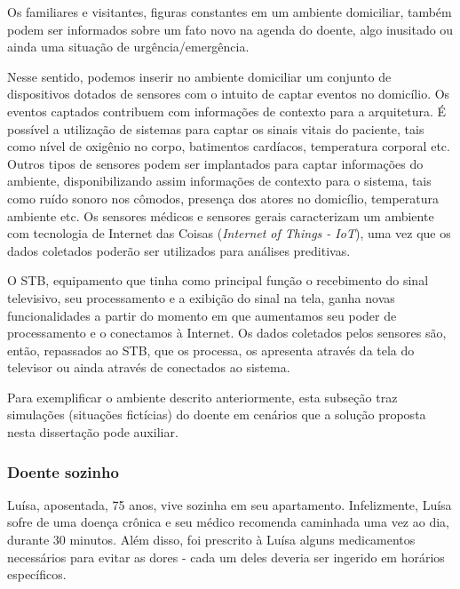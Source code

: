 Os familiares e visitantes, figuras constantes em um ambiente domiciliar, também
podem ser informados sobre um fato novo na agenda do doente, algo inusitado ou 
ainda uma situação de urgência/emergência.

Nesse sentido, podemos inserir no ambiente domiciliar um conjunto de
dispositivos dotados de sensores com o intuito de captar eventos no domicílio. 
Os eventos captados contribuem com informações de contexto para a arquitetura.
É possível a utilização de sistemas para captar os sinais vitais do paciente, tais
como nível de oxigênio no corpo, batimentos cardíacos, temperatura corporal etc.
Outros tipos de sensores podem ser implantados para captar informações do
ambiente, disponibilizando assim informações de contexto para o sistema,  tais
como ruído sonoro nos cômodos, presença dos atores no domicílio, temperatura
ambiente etc. Os sensores médicos e sensores gerais caracterizam um  ambiente 
com tecnologia de Internet das Coisas (\textit{Internet of Things  - IoT}), uma
vez que os dados coletados poderão ser utilizados para análises preditivas.

O STB, equipamento que tinha como principal função o recebimento do sinal
televisivo, seu processamento e a exibição do sinal na tela, ganha novas
funcionalidades a partir do momento em que aumentamos seu  poder de
processamento e o conectamos à Internet. Os dados coletados pelos sensores são,
então, repassados ao STB, que os processa, os apresenta através da tela do
televisor ou ainda através de \smartphones[] conectados ao sistema.


Para exemplificar o ambiente descrito anteriormente, esta subseção
traz simulações (situações fictícias) do doente em cenários que a solução
proposta nesta dissertação pode auxiliar.
\label{subsubsec:simulacoes-A}

\subsubsection{Doente sozinho}

Luísa, aposentada, 75 anos, vive sozinha em seu apartamento. Infelizmente,
Luísa sofre de uma doença crônica e seu médico recomenda caminhada uma vez ao
dia, durante 30 minutos.  Além disso, foi prescrito à Luísa alguns medicamentos
necessários para evitar as dores - cada um deles deveria ser ingerido em
horários específicos.

